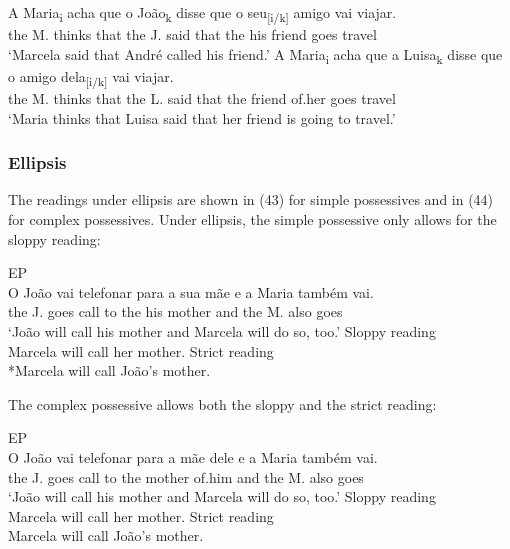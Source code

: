 \documentclass[output=paper]{langsci/langscibook}
\begin{document}
\ea%
    \label{ex:wein:42}
    \ea
    \gll A Maria\textsubscript{i} acha que o João\textsubscript{k} disse que o seu\textsubscript{[i/k]} amigo vai viajar.\\
         the M. thinks that the J. said that the his friend goes travel\\
    \glt ‘Marcela said that André called his friend.’
    \ex  
    \gll A Maria\textsubscript{i} acha que a Luisa\textsubscript{k} disse que o amigo dela\textsubscript{[i/k]} vai viajar.\\
         the M. thinks that the L. said that the friend of.her goes travel\\
    \glt ‘Maria thinks that Luisa said that her friend is going to travel.’
    \z
\z

\subsubsection{Ellipsis}%

The readings under ellipsis are shown in (43) for simple possessives and in (44) for complex possessives. Under ellipsis, the simple possessive only allows for the sloppy reading:

\ea%
         EP\label{ex:wein:43}\\
    \ea  
    \gll O João vai telefonar para a sua mãe e a Maria também vai.\\
         the J.   goes call to the his mother and the M. also goes\\
    \glt ‘João will call his mother and Marcela will do so, too.’
    \ex Sloppy reading\\
        Marcela will call her mother.
    \ex Strict reading\\
        *Marcela will call João’s mother.
    \z  
\z

The complex possessive allows both the sloppy and the strict reading:

\ea%
         EP\label{ex:wein:44}\\
    \ea  
    \gll O João vai telefonar para a mãe   dele e   a Maria também vai.\\
         the J. goes call to the mother of.him and the M. also goes\\
    \glt ‘João will call his mother and Marcela will do so, too.’
    \ex  Sloppy reading\\
         Marcela will call her mother.
    \ex  Strict reading\\
         Marcela will call João’s mother.
    \z
\z
\end{document}
